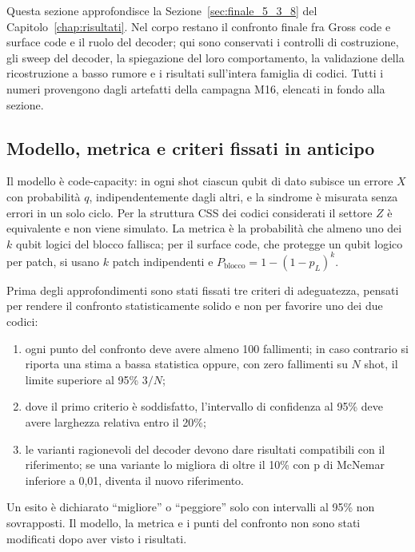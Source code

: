 \begin{onehalfspace}

Questa sezione approfondisce la Sezione~\ref{sec:finale_5_3_8} del
Capitolo~\ref{chap:risultati}. Nel corpo restano il confronto finale fra
Gross code e surface code e il ruolo del decoder; qui sono conservati i
controlli di costruzione, gli sweep del decoder, la spiegazione del loro
comportamento, la validazione della ricostruzione a basso rumore e i
risultati sull'intera famiglia di codici. Tutti i numeri provengono dagli
artefatti della campagna M16, elencati in fondo alla sezione.

\subsection{Modello, metrica e criteri fissati in anticipo}
\label{app:gross_modello}

Il modello è code-capacity: in ogni shot ciascun qubit di dato subisce un
errore $X$ con probabilità $q$, indipendentemente dagli altri, e la
sindrome è misurata senza errori in un solo ciclo. Per la struttura CSS
dei codici considerati il settore $Z$ è equivalente e non viene simulato.
La metrica è la probabilità che almeno uno dei $k$ qubit logici del blocco
fallisca; per il surface code, che protegge un qubit logico per patch, si
usano $k$ patch indipendenti e $P_{\text{blocco}} = 1-(1-p_L)^k$.

Prima degli approfondimenti sono stati fissati tre criteri di
adeguatezza, pensati per rendere il confronto statisticamente solido e
non per favorire uno dei due codici:
\begin{enumerate}
\item ogni punto del confronto deve avere almeno 100 fallimenti; in caso
  contrario si riporta una stima a bassa statistica oppure, con zero
  fallimenti su $N$ shot, il limite superiore al 95\% $3/N$;
\item dove il primo criterio è soddisfatto, l'intervallo di confidenza al
  95\% deve avere larghezza relativa entro il 20\%;
\item le varianti ragionevoli del decoder devono dare risultati
  compatibili con il riferimento; se una variante lo migliora di oltre il
  10\% con p di McNemar inferiore a 0,01, diventa il nuovo riferimento.
\end{enumerate}
Un esito è dichiarato ``migliore'' o ``peggiore'' solo con intervalli al
95\% non sovrapposti. Il modello, la metrica e i punti del confronto non
sono stati modificati dopo aver visto i risultati.


\end{onehalfspace}
